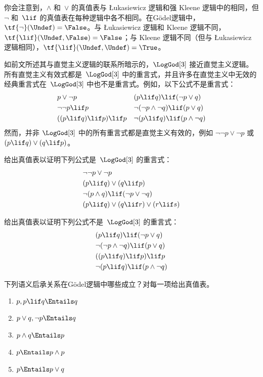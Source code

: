 \documentclass[../../../include/open-logic-section]{subfiles}
\begin{document}
你会注意到，$\land$ 和~$\lor$ 的真值表与 \L ukasiewicz 逻辑和强 Kleene 逻辑中的相同，但 $\lnot$ 和~$\lif$ 的真值表在每种逻辑中各不相同。在Gödel逻辑中，$\tf{\lnot}(\Undef) = \False$。与 \L ukasiewicz 逻辑和 Kleene 逻辑不同，$\tf{\lif}(\Undef, \False) = \False$；与 Kleene 逻辑不同（但与 \L ukasiewicz 逻辑相同），$\tf{\lif}(\Undef,
\Undef) = \True$。

如前文所述其与直觉主义逻辑的联系所暗示的，$\LogGod[3]$ 接近直觉主义逻辑。所有直觉主义有效式都是~$\LogGod[3]$ 中的重言式，并且许多在直觉主义中无效的经典重言式在~$\LogGod[3]$ 中也不是重言式。例如，以下公式不是重言式：
\begin{align*}
  & p \lor \lnot p && (p \lif q) \lif (\lnot p \lor q) \\
  & \lnot\lnot p \lif p && \lnot(\lnot p \land \lnot q) \lif (p \lor q) \\
  & ((p \lif q) \lif p) \lif p && \lnot(p \lif q) \lif (p \land \lnot q)
\end{align*}
然而，并非 $\LogGod[3]$ 中的所有重言式都是直觉主义有效的，例如 $\lnot\lnot p \lor \lnot p$ 或 $(p
\lif q) \lor (q \lif p)$。

\begin{prob}
  给出真值表以证明下列公式是~$\LogGod[3]$ 的重言式：
  \begin{align*}
    & \lnot\lnot p \lor \lnot p\\
    & (p \lif q) \lor (q \lif p) \\
    & \lnot(p \land q) \lif (\lnot p \lor \lnot q) \\
    & (p \lif q) \lor (q \lif r) \lor (r \lif s)
  \end{align*}
\end{prob}

\begin{prob}
  给出真值表以证明下列公式不是~$\LogGod[3]$ 的重言式：
  \begin{align*}
    & (p \lif q) \lif (\lnot p \lor q) \\
    & \lnot(\lnot p \land \lnot q) \lif (p \lor q) \\
    & ((p \lif q) \lif p) \lif p \\
    & \lnot(p \lif q) \lif (p \land \lnot q)
  \end{align*}
\end{prob}

\begin{prob}
  下列语义后承关系在Gödel逻辑中哪些成立？对每一项给出真值表。
  \begin{enumerate}
    \item $p, p \lif q \Entails q$
    \item $p \lor q, \lnot p \Entails q$
    \item $p \land q \Entails p$
    \item $p \Entails p \land p$
    \item $p \Entails p \lor q$
  \end{enumerate}
\end{prob}
\end{document}
